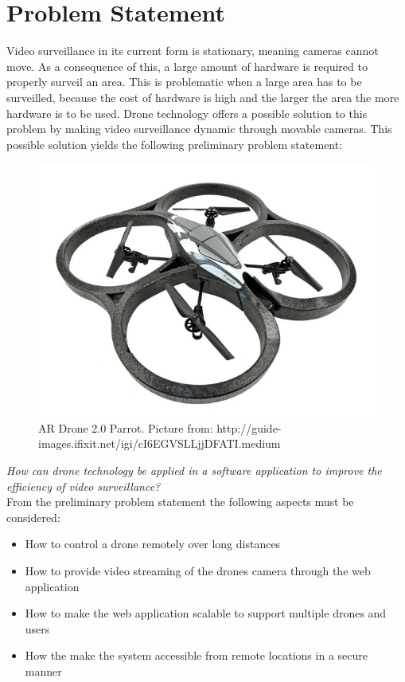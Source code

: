 \section{Problem Statement}
\label{sec:problem_definition}
Video surveillance in its current form is stationary, meaning cameras cannot move.
As a consequence of this, a large amount of hardware is required to properly surveil an area.
This is problematic when a large area has to be surveilled, because the cost of hardware is high and the larger the area the more hardware is to be used.
Drone technology offers a possible solution to this problem by making video surveillance dynamic through movable cameras.
This possible solution yields the following preliminary problem statement:\\

\begin{figure}[htb]
    \centering
    \includegraphics[width=\textwidth]{gfx/drone.jpg}
    \caption{AR Drone 2.0 Parrot. Picture from: http://guide-images.ifixit.net/igi/cI6EGVSLLjjDFATI.medium}
    \label{fig:pic_of_drone}
\end{figure}

\textit{How can drone technology be applied in a software application to improve the efficiency of video surveillance?}\\

From the preliminary problem statement the following aspects must be considered:
\begin{itemize}
	\item How to control a drone remotely over long distances
	\item How to provide video streaming of the drones camera through the web application
	\item How to make the web application scalable to support multiple drones and users
	\item How the make the system accessible from remote locations in a secure manner
\end{itemize}

